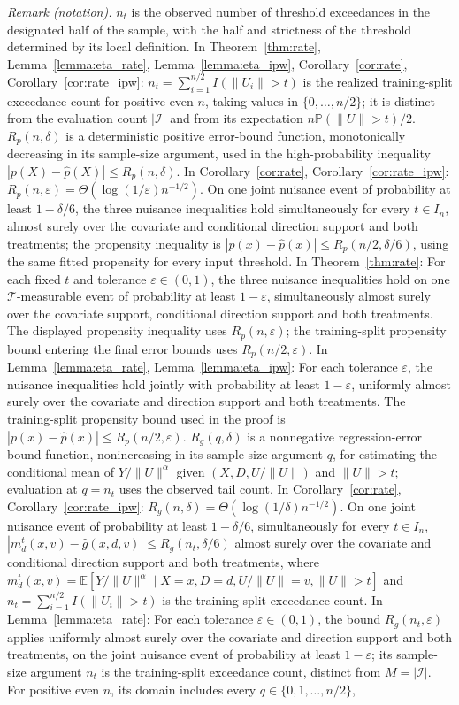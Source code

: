 \documentclass[12pt]{article}
\theoremstyle{plain}
\theoremstyle{definition}
\begin{document}
\noindent\textit{Remark (notation).} $n_t$ is the observed number of threshold exceedances in the designated half of the sample, with the half and strictness of the threshold determined by its local definition. In Theorem~\ref{thm:rate}, Lemma~\ref{lemma:eta_rate}, Lemma~\ref{lemma:eta_ipw}, Corollary~\ref{cor:rate}, Corollary~\ref{cor:rate_ipw}: $n_t=\sum_{i=1}^{n/2}I(\|U_i\|>t)$ is the realized training-split exceedance count for positive even $n$, taking values in $\{0,\ldots,n/2\}$; it is distinct from the evaluation count $|\mathcal I|$ and from its expectation $n\mathbb P(\|U\|>t)/2$. $R_p(n,\delta)$ is a deterministic positive error-bound function, monotonically decreasing in its sample-size argument, used in the high-probability inequality $|p(X)-\hat p(X)|\leqslant R_p(n,\delta)$. In Corollary~\ref{cor:rate}, Corollary~\ref{cor:rate_ipw}: $R_p(n,\varepsilon)=\Theta(\log(1/\varepsilon)n^{-1/2})$. On one joint nuisance event of probability at least $1-\delta/6$, the three nuisance inequalities hold simultaneously for every $t\in I_n$, almost surely over the covariate and conditional direction support and both treatments; the propensity inequality is $|p(x)-\hat p(x)|\leqslant R_p(n/2,\delta/6)$, using the same fitted propensity for every input threshold. In Theorem~\ref{thm:rate}: For each fixed $t$ and tolerance $\varepsilon\in(0,1)$, the three nuisance inequalities hold on one $\mathcal T$-measurable event of probability at least $1-\varepsilon$, simultaneously almost surely over the covariate support, conditional direction support and both treatments. The displayed propensity inequality uses $R_p(n,\varepsilon)$; the training-split propensity bound entering the final error bounds uses $R_p(n/2,\varepsilon)$. In Lemma~\ref{lemma:eta_rate}, Lemma~\ref{lemma:eta_ipw}: For each tolerance $\varepsilon$, the nuisance inequalities hold jointly with probability at least $1-\varepsilon$, uniformly almost surely over the covariate and direction support and both treatments. The training-split propensity bound used in the proof is $|p(x)-\hat p(x)|\leqslant R_p(n/2,\varepsilon)$. $R_g(q,\delta)$ is a nonnegative regression-error bound function, nonincreasing in its sample-size argument $q$, for estimating the conditional mean of $Y/\|U\|^\alpha$ given $(X,D,U/\|U\|)$ and $\|U\|>t$; evaluation at $q=n_t$ uses the observed tail count. In Corollary~\ref{cor:rate}, Corollary~\ref{cor:rate_ipw}: $R_g(n,\delta)=\Theta(\log(1/\delta)n^{-1/2})$. On one joint nuisance event of probability at least $1-\delta/6$, simultaneously for every $t\in I_n$, $|m_d^t(x,v)-\hat g(x,d,v)|\leqslant R_g(n_t,\delta/6)$ almost surely over the covariate and conditional direction support and both treatments, where $m_d^t(x,v)=\mathbb E[Y/\|U\|^\alpha\mid X=x,D=d,U/\|U\|=v,\|U\|>t]$ and $n_t=\sum_{i=1}^{n/2}I(\|U_i\|>t)$ is the training-split exceedance count. In Lemma~\ref{lemma:eta_rate}: For each tolerance $\varepsilon\in(0,1)$, the bound $R_g(n_t,\varepsilon)$ applies uniformly almost surely over the covariate and direction support and both treatments, on the joint nuisance event of probability at least $1-\varepsilon$; its sample-size argument $n_t$ is the training-split exceedance count, distinct from $M=|\mathcal I|$. For positive even $n$, its domain includes every $q\in\{0,1,\ldots,n/2\}$, 
\end{document}
